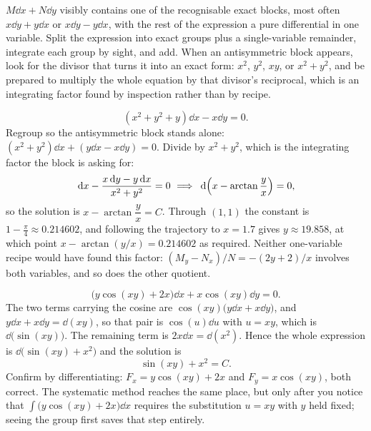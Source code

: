 \cue $M\dd x+N\dd y$ visibly contains one of the recognisable exact blocks, most often $x\dd y+y\dd x$ or $x\dd y-y\dd x$, with the rest of the expression a pure differential in one variable.
\method Split the expression into exact groups plus a single-variable remainder, integrate each group by sight, and add. When an antisymmetric block appears, look for the divisor that turns it into an exact form: $x^{2}$, $y^{2}$, $xy$, or $x^{2}+y^{2}$, and be prepared to multiply the whole equation by that divisor's reciprocal, which is an integrating factor found by inspection rather than by recipe.

\begin{worked}
\[(x^{2}+y^{2}+y)\dd x-x\dd y=0.\]
Regroup so the antisymmetric block stands alone: $(x^{2}+y^{2})\dd x+(y\dd x-x\dd y)=0$. Divide by $x^{2}+y^{2}$, which is the integrating factor the block is asking for:
\[\dd x-\frac{x\dd y-y\dd x}{x^{2}+y^{2}}=0\ \Longrightarrow\ \dd\Bigl(x-\arctan\frac{y}{x}\Bigr)=0,\]
so the solution is $x-\arctan\dfrac{y}{x}=C$. Through $(1,1)$ the constant is $1-\tfrac{\pi}{4}\approx0.214602$, and following the trajectory to $x=1.7$ gives $y\approx19.858$, at which point $x-\arctan(y/x)=0.214602$ as required. Neither one-variable recipe would have found this factor: $(M_y-N_x)/N=-(2y+2)/x$ involves both variables, and so does the other quotient.
\end{worked}

\begin{worked}
\[\bigl(y\cos(xy)+2x\bigr)\dd x+x\cos(xy)\dd y=0.\]
The two terms carrying the cosine are $\cos(xy)\bigl(y\dd x+x\dd y\bigr)$, and $y\dd x+x\dd y=\dd(xy)$, so that pair is $\cos(u)\dd u$ with $u=xy$, which is $\dd\bigl(\sin(xy)\bigr)$. The remaining term is $2x\dd x=\dd(x^{2})$. Hence the whole expression is $\dd\bigl(\sin(xy)+x^{2}\bigr)$ and the solution is
\[\sin(xy)+x^{2}=C.\]
Confirm by differentiating: $F_x=y\cos(xy)+2x$ and $F_y=x\cos(xy)$, both correct. The systematic method reaches the same place, but only after you notice that $\int\bigl(y\cos(xy)+2x\bigr)\dd x$ requires the substitution $u=xy$ with $y$ held fixed; seeing the group first saves that step entirely.
\end{worked}

